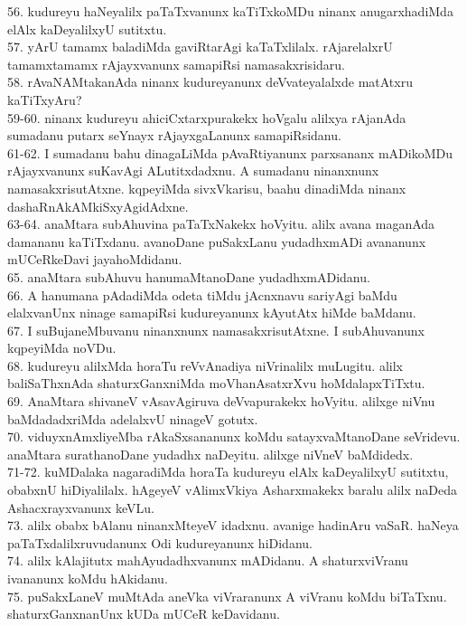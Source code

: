 \documentclass{article}
\begin{document}
56. kudureyu haNeyalilx paTaTxvanunx kaTiTxkoMDu ninanx anugarxhadiMda elAlx kaDeyalilxyU sutitxtu.\\
57. yArU tamamx baladiMda gaviRtarAgi kaTaTxlilalx. rAjarelalxrU tamamxtamamx rAjayxvanunx samapiRsi namasakxrisidaru.\\
58. rAvaNAMtakanAda ninanx kudureyanunx deVvateyalalxde matAtxru kaTiTxyAru?\\
59-60. ninanx kudureyu ahiciCxtarxpurakekx hoVgalu alilxya rAjanAda sumadanu putarx seYnayx rAjayxgaLanunx samapiRsidanu.\\
61-62. I sumadanu bahu dinagaLiMda pAvaRtiyanunx parxsananx mADikoMDu rAjayxvanunx suKavAgi ALutitxdadxnu. A sumadanu ninanxnunx namasakxrisutAtxne. kqpeyiMda sivxVkarisu, baahu dinadiMda ninanx dashaRnAkAMkiSxyAgidAdxne.\\
63-64. anaMtara subAhuvina paTaTxNakekx hoVyitu. alilx avana maganAda damananu kaTiTxdanu. avanoDane puSakxLanu yudadhxmADi avananunx mUCeRkeDavi jayahoMdidanu.\\
65. anaMtara subAhuvu hanumaMtanoDane yudadhxmADidanu.\\
66. A hanumana pAdadiMda odeta tiMdu jAcnxnavu sariyAgi baMdu elalxvanUnx ninage samapiRsi kudureyanunx kAyutAtx hiMde baMdanu.\\
67. I suBujaneMbuvanu ninanxnunx namasakxrisutAtxne. I subAhuvanunx kqpeyiMda noVDu.\\
68. kudureyu alilxMda horaTu reVvAnadiya niVrinalilx muLugitu. alilx baliSaThxnAda shaturxGanxniMda moVhanAsatxrXvu hoMdalapxTiTxtu.\\
69. AnaMtara shivaneV vAsavAgiruva deVvapurakekx hoVyitu. alilxge niVnu baMdadadxriMda adelalxvU ninageV gotutx.\\
70. viduyxnAmxliyeMba rAkaSxsananunx koMdu satayxvaMtanoDane seVridevu. anaMtara surathanoDane yudadhx naDeyitu. alilxge niVneV baMdidedx.\\
71-72. kuMDalaka nagaradiMda horaTa kudureyu elAlx kaDeyalilxyU sutitxtu, obabxnU hiDiyalilalx. hAgeyeV vAlimxVkiya Asharxmakekx baralu alilx naDeda Ashacxrayxvanunx keVLu.\\
73. alilx obabx bAlanu ninanxMteyeV idadxnu. avanige hadinAru vaSaR. haNeya paTaTxdalilxruvudanunx Odi kudureyanunx hiDidanu.\\
74. alilx kAlajitutx mahAyudadhxvanunx mADidanu. A shaturxviVranu ivananunx koMdu hAkidanu.\\
75. puSakxLaneV muMtAda aneVka viVraranunx A viVranu koMdu biTaTxnu. shaturxGanxnanUnx kUDa mUCeR keDavidanu.\\
\end{document}
